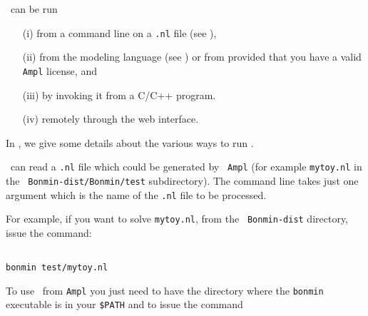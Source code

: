 \StartPageSummary
{}
\EndPageSummary
\NavigationPanel

\begin{quickref}
\end{quickref}


\Bonmin\ can be run
\begin{itemize}
\item [(i)] from a command line on a {\tt .nl} file
(see ),
\item [(ii)] from the modeling language  (see
) or from  provided
that you have a valid {\tt Ampl} license, and
\item [(iii)] by invoking it from a C/C++ program.
\item[(iv)] remotely through the  web interface.
\end{itemize}

In , we give some details about the
various ways to run \Bonmin.

\Bonmin\ can read a {\tt .nl} file which could be generated by {\tt
Ampl} (for example {\tt mytoy.nl} in the {\tt
Bonmin-dist/Bonmin/test} subdirectory). The command line takes just
one argument which is the name of the {\tt .nl} file to be
processed.

For example, if you want to solve {\tt mytoy.nl}, from the {\tt
Bonmin-dist} directory, issue the command:

\begin{colorverb}
\begin{verbatim}

bonmin test/mytoy.nl

\end{verbatim}
\end{colorverb}

To use \Bonmin\ from {\tt Ampl} you just need to have the directory where the
{\tt bonmin} executable is in your {\tt \$PATH} and to issue the
command

